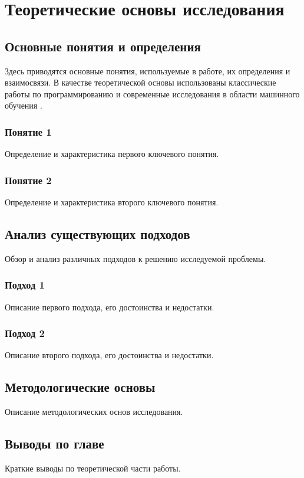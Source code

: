 \chapter{Теоретические основы исследования}

\section{Основные понятия и определения}

Здесь приводятся основные понятия, используемые в работе, их определения и взаимосвязи. В качестве теоретической основы использованы классические работы по программированию \cite{knuth_art} и современные исследования в области машинного обучения \cite{ml_conference}.

\subsection{Понятие 1}

Определение и характеристика первого ключевого понятия.

\subsection{Понятие 2}

Определение и характеристика второго ключевого понятия.

\section{Анализ существующих подходов}

Обзор и анализ различных подходов к решению исследуемой проблемы.

\subsection{Подход 1}

Описание первого подхода, его достоинства и недостатки.

\subsection{Подход 2}

Описание второго подхода, его достоинства и недостатки.

\section{Методологические основы}

Описание методологических основ исследования.

\section{Выводы по главе}

Краткие выводы по теоретической части работы.
